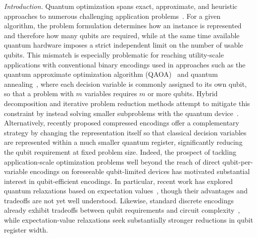\documentclass[10pt,aps,pra,twocolumn,superscriptaddress,nofootinbib,longbibliography]{revtex4-2}
\begin{document}
\emph{Introduction.} Quantum optimization spans exact, approximate, and heuristic approaches to numerous challenging application problems~\cite{Abbas2024QuantumOptimization}.  For a given algorithm, the problem formulation determines how an instance is represented and therefore how many qubits are required, while at the same time available quantum hardware imposes a strict independent limit on the number of usable qubits.  This mismatch is especially problematic for reaching utility-scale applications with conventional binary encodings used in approaches such as the quantum approximate optimization algorithm (QAOA)~\cite{Farhi2014QAOA,Hadfield2019QAOA} and quantum annealing~\cite{KadowakiNishimori1998QA,Farhi2001Adiabatic}, where each decision variable is commonly assigned to its own qubit, so that a problem with $m$ variables requires $m$ or more qubits.  Hybrid decomposition and iterative problem reduction methods attempt to mitigate this constraint by instead solving smaller subproblems with the quantum device~\cite{Ponce2025Decomposition,BradyHadfield2024IQA}.  Alternatively, recently proposed compressed encodings offer a complementary strategy by changing the representation itself so that classical decision variables are represented within a much smaller quantum register, significantly reducing the qubit requirement at fixed problem size.  Indeed, the prospect of tackling application-scale optimization problems well beyond the reach of direct qubit-per-variable encodings on foreseeable qubit-limited devices has motivated substantial interest in qubit-efficient encodings.  In particular, recent work has explored quantum relaxations based on expectation values~\cite{Tan2021QubitEfficient,Fuller2024QuantumRelaxations,Patti2022MBE,SundarDupont2026QubitEfficient,RaymondButsPistoia2025FewQubits}, though their advantages and tradeoffs are not yet well understood.  Likewise, standard discrete encodings already exhibit tradeoffs between qubit requirements and circuit complexity~\cite{Sawaya2023EncodingTradeoffs}, while expectation-value relaxations seek substantially stronger reductions in qubit register width.
\end{document}
